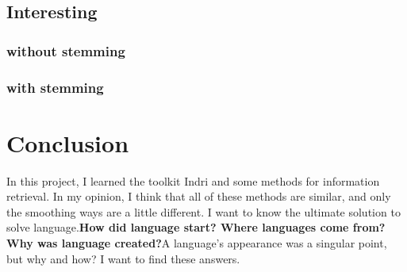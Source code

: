 \documentclass[a4pper,11pt,onecolumn]{article}
\begin{document}
\subsection{Interesting}

\subsubsection{without stemming}

\subsubsection{with stemming}

\section{Conclusion}
In this project, I learned the toolkit Indri and some methods for information retrieval. In my opinion, I think that all of these methods are similar, and only the smoothing ways are a little different. I want to know the ultimate solution to solve language.\textbf{How did language start? Where languages come from? Why was language created?}A language's appearance was a singular point, but why and how? I want to find these answers.
\end{document}
